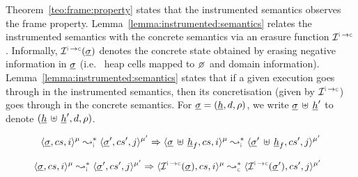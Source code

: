


Theorem~\ref{teo:frame:property} states that the \jsil instrumented semantics observes the 
frame property. Lemma~\ref{lemma:instrumented:semantics} relates the instrumented 
semantics with the concrete semantics via an erasure function  $\interpret{\instconc}{}$. Informally, $\interpret{\instconc}{}(\istate)$
denotes the concrete state obtained by erasing negative information in $\underline{\sigma}$ (i.e.~  
heap cells mapped to $\none$ and domain information). 
Lemma~\ref{lemma:instrumented:semantics} states that if a given execution 
goes through in the instrumented semantics, then its concretisation (given by $\interpret{\instconc}{}$) 
goes through in the concrete semantics. %
For $\underline{\sigma} = (\underline{h}, d, \rho)$, we write $\underline{\sigma} \, \uplus \, \underline{h}'$ to denote $(\underline{h} \, \uplus \, \underline{h}', d, \rho)$.

\begin{theorem}\label{teo:frame:property}
\hspace*{-0.28cm}$$
\transabssemrule{\istate, \cs, i}{\istate', \cs', j}{\mode}{\mode'}{\instrumented}\Rightarrow
        \transabssemrule{\istate \dunion \iheap_f, \cs, i}{\istate' \dunion \iheap_f, \cs', j}{\mode}{\mode'}{\instrumented} 
$$
\end{theorem}

\begin{lemma}\label{lemma:instrumented:semantics}
$$
\hspace*{-0.22cm}
\transabssemrule{\istate, \cs, i}{\istate', \cs', j}{\mode}{\mode'}{\instrumented} \Rightarrow \transabssemrule{\interpret{\instconc}{}(\istate), \cs, i}{\interpret{\instconc}{}(\istate'), \cs', j}{\mode}{\mode'}{\concrete} 
$$
\end{lemma}



%


